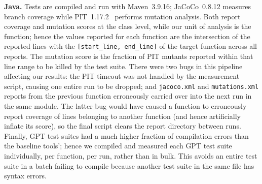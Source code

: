 \textbf{Java.} Tests are compiled and run with Maven~3.9.16; JaCoCo~0.8.12 measures branch
coverage while PIT~1.17.2~\cite{coles2016pit} performs mutation analysis. Both report
coverage and mutation scores at the class level, while our unit of analysis is the
function; hence the values reported for each function are the intersection of the
reported lines with the \texttt{[start\_line, end\_line]} of the target function across
all reports. The mutation score is the fraction of PIT mutants reported within that line
range to be killed by the test suite. There were two bugs in this pipeline affecting our
results: the PIT timeout was not handled by the measurement script, causing one entire
run to be dropped; and \texttt{jacoco.xml} and \texttt{mutations.xml} reports from the
previous function erroneously carried over into the next run in the same module. The
latter bug would have caused a function to erroneously report coverage of lines belonging
to another function (and hence artificially inflate its score), so the final script
clears the report directory between runs. Finally, GPT test suites had a much higher
fraction of compilation errors than the baseline tools'; hence we compiled and measured
each GPT test suite individually, per function, per run, rather than in bulk. This avoids
an entire test suite in a batch failing to compile because another test suite in the same
file has syntax errors.

